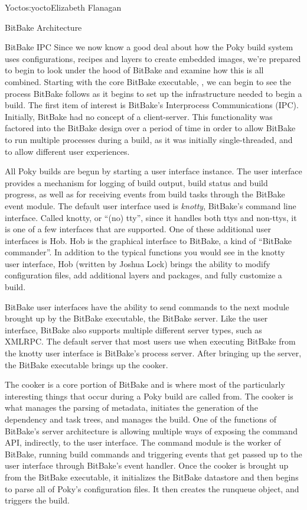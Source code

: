 \begin{aosachapter}{Yocto}{s:yocto}{Elizabeth Flanagan}
\begin{aosasect1}{BitBake Architecture}
\begin{aosasect2}{BitBake IPC}
Since we now know a good deal about how the Poky build system uses
configurations, recipes and layers to create embedded images, we're
prepared to begin to look under the hood of BitBake and examine how
this is all combined. Starting with the core BitBake executable,
, we can begin to see the process BitBake follows as it
begins to set up the infrastructure needed to begin a build. The first
item of interest is BitBake's Interprocess Communications
(IPC). Initially, BitBake had no concept of a
client-server. This functionality was factored into the BitBake design
over a period of time in order to allow BitBake to run multiple
processes during a build, as it was initially single-threaded, and to
allow different user experiences.


All Poky builds are begun by starting a user interface instance. The
user interface provides a mechanism for logging of build output, build
status and build progress, as well as for receiving events from build tasks
through the BitBake event module.  The default user interface used is
\emph{knotty}, BitBake's command line interface. Called knotty, or ``(no)
tty'', since it handles both ttys and non-ttys, it is one of a few
interfaces that are supported.  One of these additional user
interfaces is Hob. Hob is the graphical interface to BitBake, a kind
of ``BitBake commander''. In addition to the typical functions you
would see in the knotty user interface, Hob (written by Joshua Lock)
brings the ability to modify configuration files, add additional
layers and packages, and fully customize a build.

BitBake user interfaces have the ability to send commands to the next
module brought up by the BitBake executable, the BitBake server. Like
the user interface, BitBake also supports multiple different server
types, such as XMLRPC. The default server that most users use
when executing BitBake from the knotty user interface is BitBake's
process server. After bringing up the server, the BitBake executable
brings up the cooker.

The cooker is a core portion of BitBake and is where most of the
particularly interesting things that occur during a Poky build are
called from. The cooker is what manages the parsing of metadata,
initiates the generation of the dependency and task trees, and manages
the build. One of the functions of BitBake's server architecture is
allowing multiple ways of exposing the command API, indirectly, to the
user interface. The command module is the worker of BitBake, running
build commands and triggering events that get passed up to the user
interface through BitBake's event handler.  Once the cooker is brought
up from the BitBake executable, it initializes the BitBake datastore
and then begins to parse all of Poky's configuration files. It then
creates the runqueue object, and triggers the build.


\end{aosasect2}
\end{aosasect1}
\end{aosachapter}
